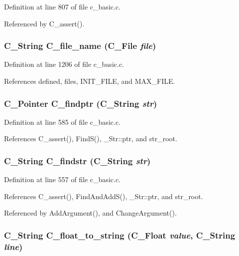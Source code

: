 Definition at line 807 of file c\_\-basic.c.

Referenced by C\_\-assert().
\subsubsection{\setlength{\rightskip}{0pt plus 5cm}\bf{C\_\-String} C\_\-file\_\-name (\bf{C\_\-File} {\em file})}\label{c__basic_8c_db58c65b7e74e25e976ba6e120ed4fff}




Definition at line 1206 of file c\_\-basic.c.

References defined, files, INIT\_\-FILE, and MAX\_\-FILE.
\subsubsection{\setlength{\rightskip}{0pt plus 5cm}\bf{C\_\-Pointer} C\_\-findptr (\bf{C\_\-String} {\em str})}\label{c__basic_8c_e0b71de272307872c136d57ec2b265b4}




Definition at line 585 of file c\_\-basic.c.

References C\_\-assert(), Find\-S(), \_\-Str::ptr, and str\_\-root.
\subsubsection{\setlength{\rightskip}{0pt plus 5cm}\bf{C\_\-String} C\_\-findstr (\bf{C\_\-String} {\em str})}\label{c__basic_8c_160629f63c002bc5a860040ef7ca5dd0}




Definition at line 557 of file c\_\-basic.c.

References C\_\-assert(), Find\-And\-Add\-S(), \_\-Str::ptr, and str\_\-root.

Referenced by Add\-Argument(), and Change\-Argument().
\subsubsection{\setlength{\rightskip}{0pt plus 5cm}\bf{C\_\-String} C\_\-float\_\-to\_\-string (\bf{C\_\-Float} {\em value}, \bf{C\_\-String} {\em line})}\label{c__basic_8c_54cde48b77c2ccececa4698b6fe2d79b}




